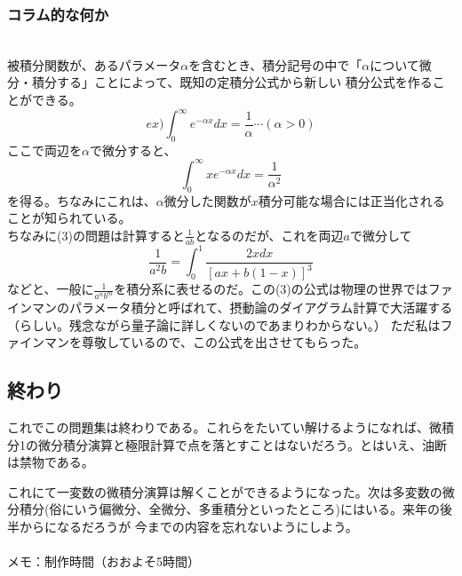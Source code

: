 \documentclass[a4j,dvipdfmx]{jsarticle}
\begin{document}
\subsubsection*{コラム的な何か}
\\
被積分関数が、あるパラメータ$\alpha$を含むとき、積分記号の中で「$\alpha$について微分・積分する」ことによって、既知の定積分公式から新しい
積分公式を作ることができる。\\
\begin{equation*}
    ex) \int_0^{\infty}e^{-\alpha x}dx =\frac{1}{\alpha}\cdots(\alpha>0)
\end{equation*}
ここで両辺を$\alpha$で微分すると、
\begin{equation*}
    \int_0^{\infty}xe^{-\alpha x}dx =\frac{1}{\alpha^2}
\end{equation*}
を得る。ちなみにこれは、$\alpha$微分した関数が$x$積分可能な場合には正当化されることが知られている。\\
ちなみに(3)の問題は計算すると$\frac{1}{ab}$となるのだが、これを両辺$a$で微分して
\begin{equation*}
    \frac{1}{a^2b}=\int_0^1\frac{2x dx}{[ax+b(1-x)]^3}
\end{equation*}
などと、一般に$\frac{1}{a^nb^m}$を積分系に表せるのだ。この(3)の公式は物理の世界ではファインマンのパラメータ積分と呼ばれて、摂動論のダイアグラム計算で大活躍する（らしい。残念ながら量子論に詳しくないのであまりわからない。）
ただ私はファインマンを尊敬しているので、この公式を出させてもらった。
\normalsize
\subsection*{終わり}
これでこの問題集は終わりである。これらをたいてい解けるようになれば、微積分1の微分積分演算と極限計算で点を落とすことはないだろう。とはいえ、油断は禁物である。

これにて一変数の微積分演算は解くことができるようになった。次は多変数の微分積分(俗にいう偏微分、全微分、多重積分といったところ)にはいる。来年の後半からになるだろうが
今までの内容を忘れないようにしよう。\\\\
メモ：制作時間（おおよそ5時間）
\end{document}
